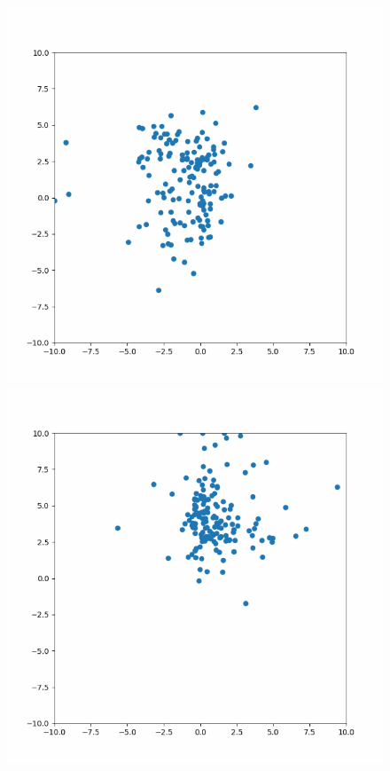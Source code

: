 \documentclass[conference]{IEEEtran}
\begin{document}
\begin{figure}[htbp]
\begin{center}
    	\includegraphics[scale=0.3]{imagens-pso/particle-swarm-optimization-leader-moving-03.png}
    	\includegraphics[scale=0.3]{imagens-pso/particle-swarm-optimization-leader-moving-04.png}

\end{center}
\end{figure}
\end{document}
